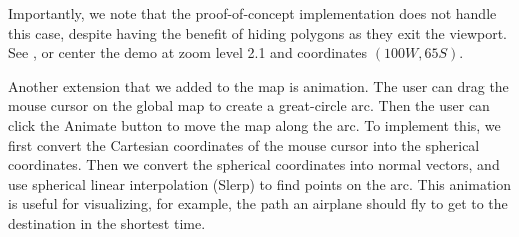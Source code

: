 Importantly, we note that the proof-of-concept implementation does not handle
  this case, despite having the benefit of hiding polygons as they exit the
  viewport.
See , or center the demo at zoom level 2.1 and coordinates
  $(100W, 65S)$.



Another extension that we added to the map is animation. The user can drag the mouse cursor on the global map to create a great-circle arc. Then the user can click the Animate button to move the map along the arc. To implement this, we first convert the Cartesian coordinates of the mouse cursor into the spherical coordinates. Then we convert the spherical coordinates into normal vectors, and use spherical linear interpolation (Slerp) to find points on the arc. This animation is useful for visualizing, for example, the path an airplane should fly to get to the destination in the shortest time.


